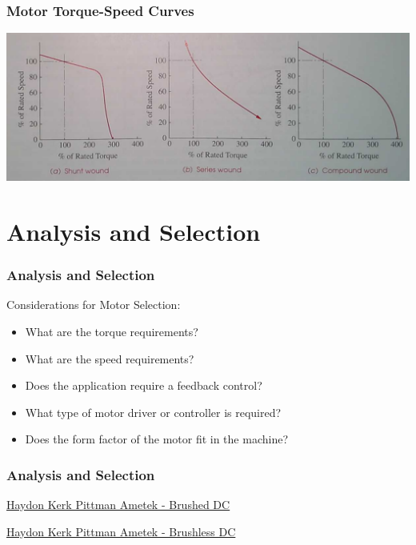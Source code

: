 \documentclass[fleqn]{beamer} %
\newcommand{\sectiontitleIII}{Motor Torque-Speed Curves}
\newcommand{\sectiontitleIV}{Analysis and Selection}
\begin{document}
	\begin{frame}[label=sectionIII] \small
		\frametitle{\sectiontitleIII}
	 		

		\includegraphics[scale=.25]{images/torque_speed_various.png}

	        
		\end{frame}  
	
\section{\sectiontitleIV}	

	    \begin{frame}[label=sectionIV] \small
		\frametitle{\sectiontitleIV}    
  
	  		Considerations for Motor Selection:
	  		\begin{itemize}
	  			\item What are the torque requirements?
	  			\item What are the speed requirements?
	  			\item Does the application require a feedback control?
	  			\item What type of motor driver or controller is required?
	  			\item Does the form factor of the motor fit in the machine?
	  		\end{itemize}



		\end{frame}

	    \begin{frame}[label=sectionIV] \small
		\frametitle{\sectiontitleIV}    
  
  		\href{https://www.haydonkerkpittman.com/products/motors/brushed-dc-motors/dc054b}{Haydon Kerk Pittman Ametek - Brushed DC }

  		\href{https://www.haydonkerkpittman.com/products/motors/brushless-dc-motors/ec057b}{Haydon Kerk Pittman Ametek - Brushless DC }



		\end{frame}
		
\end{document}
